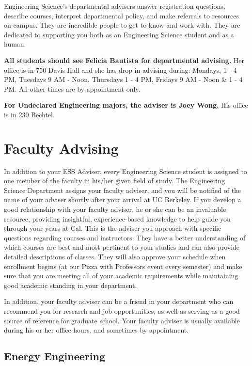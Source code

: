 Engineering Science’s departmental advisers answer registration questions, describe courses, interpret departmental policy, and make referrals to resources on campus. They are incredible people to get to know and work with. They are dedicated to supporting you both as an Engineering Science student and as a human.

\textbf{All students should see Felicia Bautista for departmental advising.} Her office is in 750 Davis Hall and she has drop-in advising during: Mondays, 1 - 4 PM, Tuesdays 9 AM - Noon, Thursdays 1 - 4 PM, Fridays 9 AM - Noon \& 1 - 4 PM. All other times are by appointment only.

\textbf{For Undeclared Engineering majors, the adviser is Joey Wong.} His office is in 230 Bechtel.

\section*{Faculty Advising}

In addition to your ESS Adviser, every Engineering Science student is assigned to one member of the faculty in his/her given field of study.
The Engineering Science Department assigns your faculty adviser, and you will be notified of the name of your adviser shortly after your arrival at UC Berkeley. If you develop a good relationship with your faculty adviser, he or she can be an invaluable resource, providing insightful, experience-based knowledge to help guide you through your years at Cal. This is the adviser you approach with specific questions regarding courses and instructors. They have a better understanding of which courses are best and most pertinent to your studies and can also provide detailed descriptions of classes. They will also approve your schedule when enrollment begins (at our Pizza with Professors event every semester) and make sure that you are meeting all of your academic requirements while maintaining good academic standing in your department.

In addition, your faculty adviser can be a friend in your department who can recommend you for research and job opportunities, as well as serving as a good source of reference for graduate school. Your faculty adviser is usually available during his or her office hours, and sometimes by appointment.

\subsection*{Energy Engineering}

